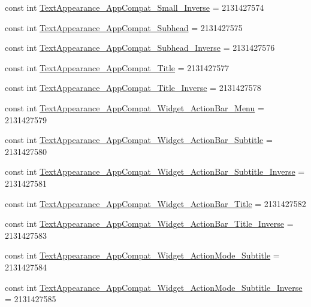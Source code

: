 \begin{CompactItemize}
const int \hyperlink{class__2doo_1_1_droid_1_1_resource_1_1_style_0f8347ba5e7a64be349c55b44d5adbb5}{TextAppearance\_\-AppCompat\_\-Small\_\-Inverse} = 2131427574
\item 
const int \hyperlink{class__2doo_1_1_droid_1_1_resource_1_1_style_014d47bfe1b5877ed6d60eb983b652a8}{TextAppearance\_\-AppCompat\_\-Subhead} = 2131427575
\item 
const int \hyperlink{class__2doo_1_1_droid_1_1_resource_1_1_style_48216ef00e49ebc0471025fc45a9b786}{TextAppearance\_\-AppCompat\_\-Subhead\_\-Inverse} = 2131427576
\item 
const int \hyperlink{class__2doo_1_1_droid_1_1_resource_1_1_style_58fc1bca51dd02da8e652326e5ea0c4e}{TextAppearance\_\-AppCompat\_\-Title} = 2131427577
\item 
const int \hyperlink{class__2doo_1_1_droid_1_1_resource_1_1_style_cfc957562255a25ae2fc4f55dd8e2e92}{TextAppearance\_\-AppCompat\_\-Title\_\-Inverse} = 2131427578
\item 
const int \hyperlink{class__2doo_1_1_droid_1_1_resource_1_1_style_235cb4e532f2a7a02939fceaf78bdc58}{TextAppearance\_\-AppCompat\_\-Widget\_\-ActionBar\_\-Menu} = 2131427579
\item 
const int \hyperlink{class__2doo_1_1_droid_1_1_resource_1_1_style_4e7b448c4b826a4604aabbabee2787f3}{TextAppearance\_\-AppCompat\_\-Widget\_\-ActionBar\_\-Subtitle} = 2131427580
\item 
const int \hyperlink{class__2doo_1_1_droid_1_1_resource_1_1_style_1c898948014c75a7adc007a2c664e7ae}{TextAppearance\_\-AppCompat\_\-Widget\_\-ActionBar\_\-Subtitle\_\-Inverse} = 2131427581
\item 
const int \hyperlink{class__2doo_1_1_droid_1_1_resource_1_1_style_3fced6d057b4bb2aea5ce875180c1277}{TextAppearance\_\-AppCompat\_\-Widget\_\-ActionBar\_\-Title} = 2131427582
\item 
const int \hyperlink{class__2doo_1_1_droid_1_1_resource_1_1_style_b155d9e6a8b300c2a8495f5371f8511e}{TextAppearance\_\-AppCompat\_\-Widget\_\-ActionBar\_\-Title\_\-Inverse} = 2131427583
\item 
const int \hyperlink{class__2doo_1_1_droid_1_1_resource_1_1_style_3c7648bc560549ffc79422cf5ef86ab6}{TextAppearance\_\-AppCompat\_\-Widget\_\-ActionMode\_\-Subtitle} = 2131427584
\item 
const int \hyperlink{class__2doo_1_1_droid_1_1_resource_1_1_style_0b480ed91c7892ae31c8ed42cf3093a1}{TextAppearance\_\-AppCompat\_\-Widget\_\-ActionMode\_\-Subtitle\_\-Inverse} = 2131427585
\item 

\end{CompactItemize}
